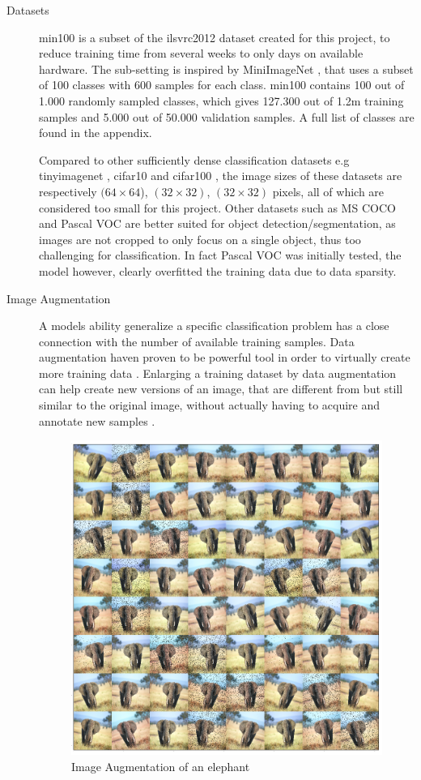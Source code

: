 \begin{description}
	\item[Datasets] \gls{min100} is a subset of the \gls{ilsvrc2012} dataset \cite{russakovsky_imagenet_2015} created for this project, to reduce training time from several weeks to only days on available hardware. The sub-setting is inspired by MiniImageNet \cite{vinyals_matching_2016}, that uses a subset of 100 classes with 600 samples for each class. \gls{min100} contains 100 out of 1.000 randomly sampled classes, which gives 127.300 out of 1.2m training samples and 5.000 out of 50.000 validation samples. A full list of classes are found in the appendix. 
	
	Compared to other sufficiently dense classification datasets e.g \gls{tinyimagenet} \cite{li_cs231n:_2018}, \gls{cifar10} and \gls{cifar100} \cite{krizhevsky_cifar-10_nodate}, the image sizes of these datasets are respectively $(64\times 64$), $(32\times 32)$, $(32\times 32)$ pixels, all of which are considered too small  for this project. Other datasets such as MS COCO and Pascal VOC are better suited for object detection/segmentation, as images are not cropped to only focus on a single object, thus too challenging for classification. In fact Pascal VOC was initially tested, the model however, clearly overfitted the training data due to data sparsity. 
	
	\item[Image Augmentation] A models ability generalize a specific classification problem has a close connection with the number of available training samples. Data augmentation haven proven to be powerful tool in order to virtually create more training data \cite{perez_effectiveness_2017}. Enlarging a training dataset by data augmentation can help create new versions of an image, that are different from but still similar to the original image, without actually having to acquire and annotate new samples \cite{goodfellow_deep_2016}.  
	
	\begin{figure}[H]
		\centering
		\includegraphics[width=.7\linewidth]{figures/augmentation/augmentation_high_resolution.png}
		\caption[Image Augmentaion Example]{Image Augmentation of an elephant}
		\label{fig:augmentation}
	\end{figure}
	

\end{description}
